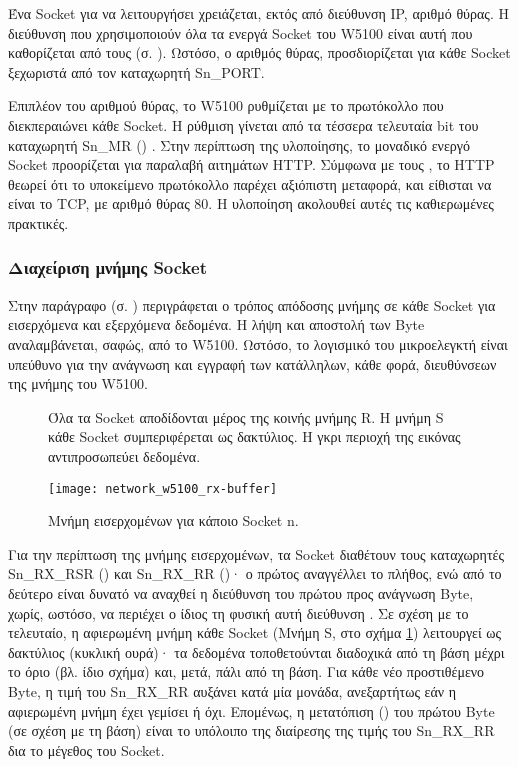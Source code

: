 Ένα Socket για να λειτουργήσει χρειάζεται, εκτός από διεύθυνση IP, αριθμό θύρας.
Η διεύθυνση που χρησιμοποιούν όλα τα ενεργά Socket του W5100 είναι αυτή που
καθορίζεται από τους
(σ. \pageref{ssubsec:network:addr-registers}).
Ωστόσο, ο αριθμός θύρας, προσδιορίζεται για κάθε Socket ξεχωριστά από τον
καταχωρητή Sn\_PORT.

Επιπλέον του αριθμού θύρας, το W5100 ρυθμίζεται με το πρωτόκολλο που
διεκπεραιώνει κάθε Socket. Η ρύθμιση γίνεται από τα τέσσερα τελευταία bit του
καταχωρητή Sn\_MR () \parencite[25--26]{wiz11:w5100}.
Στην περίπτωση της υλοποίησης, το μοναδικό ενεργό Socket προορίζεται για
παραλαβή αιτημάτων HTTP. Σύμφωνα με τους \textcite[13]{rfc2616}, το HTTP θεωρεί
ότι το υποκείμενο πρωτόκολλο παρέχει αξιόπιστη μεταφορά, και είθισται να είναι
το TCP, με αριθμό θύρας 80. Η υλοποίηση ακολουθεί αυτές τις καθιερωμένες
πρακτικές.


\subsubsection{Διαχείριση μνήμης Socket}
\label{ssubsec:network:rx-tx-buffer}

Στην παράγραφο
 (σ. \pageref{ssubsec:network:rmsr_tmsr})
περιγράφεται ο τρόπος απόδοσης μνήμης σε κάθε Socket για εισερχόμενα και
εξερχόμενα δεδομένα. Η λήψη και αποστολή των Byte αναλαμβάνεται, σαφώς, από το
W5100. Ωστόσο, το λογισμικό του μικροελεγκτή είναι υπεύθυνο για την ανάγνωση και
εγγραφή των κατάλληλων, κάθε φορά, διευθύνσεων της μνήμης του W5100.

\begin{figure}
    \caption{Μνήμη εισερχομένων για κάποιο Socket n.
    \label{fig:network:w5100-rx-buffer}}

    Όλα τα Socket αποδίδονται μέρος της κοινής μνήμης R. Η μνήμη
    S κάθε Socket συμπεριφέρεται ως δακτύλιος. Η γκρι περιοχή της
    εικόνας αντιπροσωπεύει δεδομένα.

    \begin{center}
    \texttt{[image: network\_w5100\_rx-buffer]}
    \end{center}
\end{figure}

Για την περίπτωση της μνήμης εισερχομένων, τα Socket διαθέτουν τους καταχωρητές
Sn\_RX\_RSR () και
Sn\_RX\_RR ()· ο πρώτος αναγγέλλει το πλήθος, ενώ
από το δεύτερο είναι δυνατό να αναχθεί η διεύθυνση του πρώτου προς ανάγνωση
Byte, χωρίς, ωστόσο, να περιέχει ο ίδιος τη φυσική αυτή διεύθυνση
\parencite[35--36]{wiz11:w5100}. Σε σχέση με το τελευταίο, η αφιερωμένη μνήμη
κάθε Socket (Μνήμη S, στο σχήμα \ref{fig:network:w5100-rx-buffer})
λειτουργεί ως δακτύλιος (κυκλική ουρά)· τα δεδομένα τοποθετούνται διαδοχικά από
τη βάση μέχρι το όριο (βλ. ίδιο σχήμα) και, μετά, πάλι από τη βάση.
Για κάθε νέο προστιθέμενο Byte, η τιμή του Sn\_RX\_RR αυξάνει κατά μία μονάδα,
ανεξαρτήτως εάν η αφιερωμένη μνήμη έχει γεμίσει ή όχι. Επομένως, η μετατόπιση
() του πρώτου Byte (σε σχέση με τη βάση) είναι το υπόλοιπο της
διαίρεσης της τιμής του Sn\_RX\_RR δια το μέγεθος του Socket.

